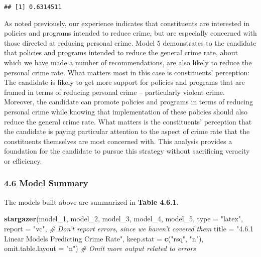 \documentclass[]{article}
\newenvironment{Shaded}{\begin{snugshade}}{\end{snugshade}}
\newcommand{\KeywordTok}[1]{\textcolor[rgb]{0.13,0.29,0.53}{\textbf{#1}}}
\newcommand{\DataTypeTok}[1]{\textcolor[rgb]{0.13,0.29,0.53}{#1}}
\newcommand{\DecValTok}[1]{\textcolor[rgb]{0.00,0.00,0.81}{#1}}
\newcommand{\StringTok}[1]{\textcolor[rgb]{0.31,0.60,0.02}{#1}}
\newcommand{\CommentTok}[1]{\textcolor[rgb]{0.56,0.35,0.01}{\textit{#1}}}
\newcommand{\OperatorTok}[1]{\textcolor[rgb]{0.81,0.36,0.00}{\textbf{#1}}}
\newcommand{\NormalTok}[1]{#1}
\begin{document}
\begin{Shaded}
\end{Shaded}

\begin{verbatim}
## [1] 0.6314511
\end{verbatim}

As noted previously, our experience indicates that constituents are
interested in policies and programs intended to reduce crime, but are
especially concerned with those directed at reducing personal crime.
Model 5 demonstrates to the candidate that policies and programs
intended to reduce the general crime rate, about which we have made a
number of recommendations, are also likely to reduce the personal crime
rate. What matters most in this case is constituents' perception: The
candidate is likely to get more support for policies and programs that
are framed in terms of reducing personal crime -- particularly violent
crime. Moreover, the candidate can promote policies and programs in
terms of reducing personal crime while knowing that implementation of
these policies should also reduce the general crime rate. What matters
is the constituents' perception that the candidate is paying particular
attention to the aspect of crime rate that the constituents themselves
are most concerned with. This analysis provides a foundation for the
candidate to pursue this strategy without sacrificing veracity or
efficiency.

\subsubsection{4.6 Model Summary}\label{model-summary}

The models built above are summarized in \textbf{Table 4.6.1}.

\begin{Shaded}
\begin{Highlighting}[]
\KeywordTok{stargazer}\NormalTok{(model_}\DecValTok{1}\NormalTok{, model_}\DecValTok{2}\NormalTok{, model_}\DecValTok{3}\NormalTok{, model_}\DecValTok{4}\NormalTok{, model_}\DecValTok{5}\NormalTok{, }\DataTypeTok{type =} \StringTok{"latex"}\NormalTok{, }
          \DataTypeTok{report =} \StringTok{"vc"}\NormalTok{, }\CommentTok{# Don't report errors, since we haven't covered them}
          \DataTypeTok{title =} \StringTok{"4.6.1 Linear Models Predicting Crime Rate"}\NormalTok{,}
          \DataTypeTok{keep.stat =} \KeywordTok{c}\NormalTok{(}\StringTok{"rsq"}\NormalTok{, }\StringTok{"n"}\NormalTok{),}
          \DataTypeTok{omit.table.layout =} \StringTok{"n"}\NormalTok{) }\CommentTok{# Omit more output related to errors}
\end{Highlighting}
\end{Shaded}
\end{document}
